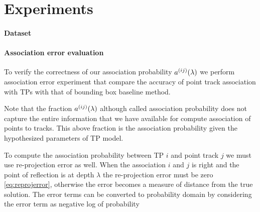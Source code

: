 \section{Experiments}
\label{sec:experiments}


\paragraph{Dataset}



\paragraph{Association error evaluation}

To verify the correctness of our association probability $a^{(ij)}(\lambda)$ we perform
association error experiment that compare the accuracy of point track
association with TPs with that of bounding box baseline method.

% 

Note that the fraction $a^{(ij)}(\lambda)$ although called association probability does
not capture the entire information that we have available for compute
association of points to tracks. This above fraction is the association
probability given the hypothesized parameters of TP model. 

To compute the association probability between TP $i$ and
point track $j$ we must use re-projection error as well. When the association
$i$ and $j$ is right and the point of reflection is at depth $\lambda$ the
re-projection error must be zero \eqref{eq:reprojerror}, otherwise the error
becomes a measure of distance from the true solution.
The error terms can be converted to probability domain by considering the error
term as negative log of probability

